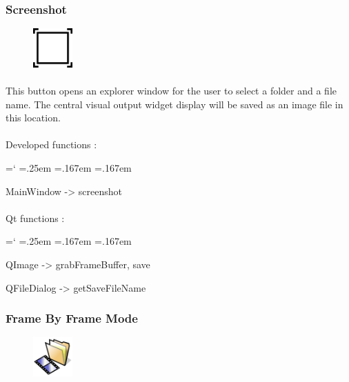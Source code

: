\documentclass[12pt]{report}
\DeclareRobustCommand*{\ttfamily}{
  \origttfamily
  \hyphenchar\font=`\-\relax
  \fontdimen3\font=.25em\relax
  \fontdimen4\font=.167em\relax
  \fontdimen7\font=.167em\relax
}
\newenvironment{code}{\ttfamily}{}
\begin{document}
\subsubsection{Screenshot}

\begin{figure}
\vspace{-20pt}
\includegraphics[width=1.5cm]{icons/screenshot.png}
\end{figure}
\paragraph{}
	This button opens an explorer window for the user to select a folder and a file name. The central visual output widget display will be saved as an image file in this location.

\paragraph{}
	Developed functions :

	\begin{code}
	MainWindow -> screenshot
	\end{code}

\paragraph{}
	Qt functions :

	\begin{code}
	QImage -> grabFrameBuffer, save
	
	QFileDialog -> getSaveFileName	
	\end{code}



\subsubsection{Frame By Frame Mode}

\begin{figure}
\vspace{-20pt}
\includegraphics[width=1.5cm]{icons/frameByFrame.png}
\end{figure}
\end{document}
